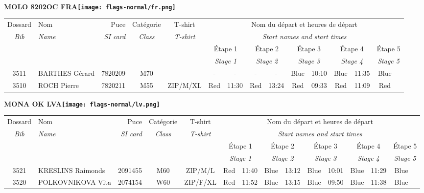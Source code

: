 \documentclass{report}
\begin{document}
\newpage
  \Huge \centering \bfseries MOLO 8202OC FRA\normalfont \footnotesize \sffamily \hfill \texttt{[image: flags-normal/fr.png]} \newline 
  \begin{longtable}{|c|l|r|c|c|*{5}{cc|}}
    Dossard & Nom  & Puce    & Catégorie & T-shirt & \multicolumn{10}{c|}{Nom du départ et heures de départ} \\
    \itshape Bib     & \itshape Name & \itshape SI card & \itshape Class  & \itshape  T-shirt  & \multicolumn{10}{c|}{\itshape Start names and start times} \\
    \hline
    & & & & & \multicolumn{2}{c|}{Étape 1} & \multicolumn{2}{c|}{Étape 2} & \multicolumn{2}{c|}{Étape 3} & \multicolumn{2}{c|}{Étape 4} & \multicolumn{2}{c|}{Étape 5} \\
    & & & & & \multicolumn{2}{c|}{\itshape Stage 1} & \multicolumn{2}{c|}{\itshape Stage 2} & \multicolumn{2}{c|}{\itshape Stage 3} & \multicolumn{2}{c|}{\itshape Stage 4} & \multicolumn{2}{c|}{\itshape Stage 5} \\
    \hline
    3511 & BARTHES Gérard & 7820209 & M70 &   & - &  - & - &  - & Blue & 10:10 & Blue & 11:35 & Blue &  \\
    3510 & ROCH Pierre & 7820211 & M55 & ZIP/M/XL & Red & 11:30 & Red & 13:24 & Red & 09:33 & Red & 11:09 & Red &  \\
  \end{longtable}
\newpage
  \Huge \centering \bfseries MONA OK  LVA\normalfont \footnotesize \sffamily \hfill \texttt{[image: flags-normal/lv.png]} \newline 
  \begin{longtable}{|c|l|r|c|c|*{5}{cc|}}
    Dossard & Nom  & Puce    & Catégorie & T-shirt & \multicolumn{10}{c|}{Nom du départ et heures de départ} \\
    \itshape Bib     & \itshape Name & \itshape SI card & \itshape Class  & \itshape  T-shirt  & \multicolumn{10}{c|}{\itshape Start names and start times} \\
    \hline
    & & & & & \multicolumn{2}{c|}{Étape 1} & \multicolumn{2}{c|}{Étape 2} & \multicolumn{2}{c|}{Étape 3} & \multicolumn{2}{c|}{Étape 4} & \multicolumn{2}{c|}{Étape 5} \\
    & & & & & \multicolumn{2}{c|}{\itshape Stage 1} & \multicolumn{2}{c|}{\itshape Stage 2} & \multicolumn{2}{c|}{\itshape Stage 3} & \multicolumn{2}{c|}{\itshape Stage 4} & \multicolumn{2}{c|}{\itshape Stage 5} \\
    \hline
    3521 & KRESLINS Raimonds & 2091455 & M60 & ZIP/M/L & Red & 11:40 & Blue & 13:12 & Blue & 10:01 & Blue & 11:29 & Blue &  \\
    3520 & POLKOVNIKOVA Vita & 2074154 & W60 & ZIP/F/XL & Red & 11:52 & Blue & 13:15 & Blue & 09:50 & Blue & 11:38 & Blue &  \\
  \end{longtable}
\end{document}
